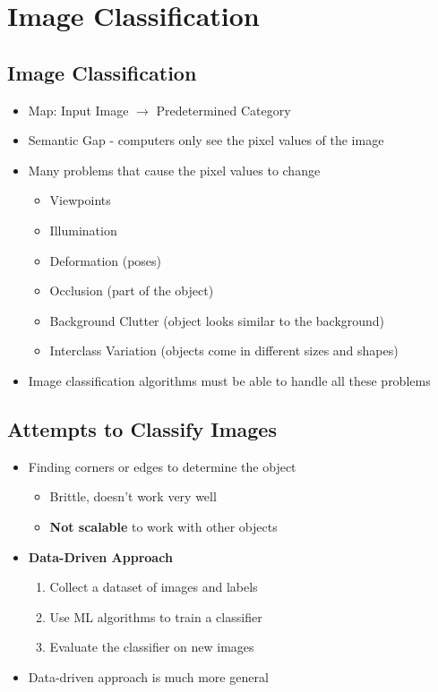 \section{Image Classification}
\subsection{Image Classification}
\begin{itemize}
	\item Map: Input Image $\rightarrow$ Predetermined Category
	\item Semantic Gap - computers only see the pixel values of the image
	\item Many problems that cause the pixel values to change
	\begin{itemize}
		\item Viewpoints
		\item Illumination
		\item Deformation (poses)
		\item Occlusion (part of the object)
		\item Background Clutter (object looks similar to the background)
		\item Interclass Variation (objects come in different sizes and shapes)
	\end{itemize}
	\item Image classification algorithms must be able to handle all these problems
\end{itemize}

\subsection{Attempts to Classify Images}
\begin{itemize}
	\item Finding corners or edges to determine the object
	\begin{itemize}
		\item Brittle, doesn't work very well
		\item \textbf{Not scalable} to work with other objects
	\end{itemize}
	\item \textbf{Data-Driven Approach}
	\begin{enumerate}
		\item Collect a dataset of images and labels
		\item Use ML algorithms to train a classifier
		\item Evaluate the classifier on new images
	\end{enumerate}
	\item Data-driven approach is much more general
\end{itemize}

